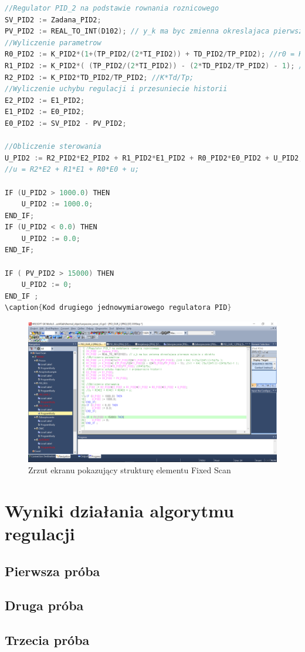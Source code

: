 \begin{lstlisting}[caption={Kod drugiego jednowymiarowego regulatora PID}, language=C]
//Regulator PID_2 na podstawie rownania roznicowego
SV_PID2 := Zadana_PID2;
PV_PID2 := REAL_TO_INT(D102); // y_k ma byc zmienna okreslajaca pierwsze wyjscie z obiektu 
//Wyliczenie parametrow
R0_PID2 := K_PID2*(1+(TP_PID2/(2*TI_PID2)) + TD_PID2/TP_PID2); //r0 = K*( 1+(Tp/(2*Ti))+Td/Tp );
R1_PID2 := K_PID2*( (TP_PID2/(2*TI_PID2)) - (2*TD_PID2/TP_PID2) - 1); //r1 = K*( (Tp/(2*Ti))-(2*Td/Tp)-1 );
R2_PID2 := K_PID2*TD_PID2/TP_PID2; //K*Td/Tp;
//Wyliczenie uchybu regulacji i przesuniecie historii
E2_PID2 := E1_PID2;
E1_PID2 := E0_PID2;
E0_PID2 := SV_PID2 - PV_PID2;

//Obliczenie sterowania
U_PID2 := R2_PID2*E2_PID2 + R1_PID2*E1_PID2 + R0_PID2*E0_PID2 + U_PID2;
//u = R2*E2 + R1*E1 + R0*E0 + u;

IF (U_PID2 > 1000.0) THEN
	U_PID2 := 1000.0;
END_IF;
IF (U_PID2 < 0.0) THEN
	U_PID2 := 0.0;
END_IF;

IF ( PV_PID2 > 15000) THEN
	U_PID2 := 0;
END_IF ;
\caption{Kod drugiego jednowymiarowego regulatora PID}
\end{lstlisting}

\begin{figure}[H]
\includegraphics[scale=0.43]{sections/thermal/DrzewkoZFolderami.png}
\caption{Zrzut ekranu pokazujący strukturę elementu Fixed Scan}
\end{figure}


\section{Wyniki działania algorytmu regulacji}
\label{thermal_pid_wyniki}

\subsection{Pierwsza próba}
\label{thermal_pid_proba_1}

\subsection{Druga próba}
\label{thermal_pid_proba_2}

\subsection{Trzecia próba}
\label{thermal_pid_proba_3}